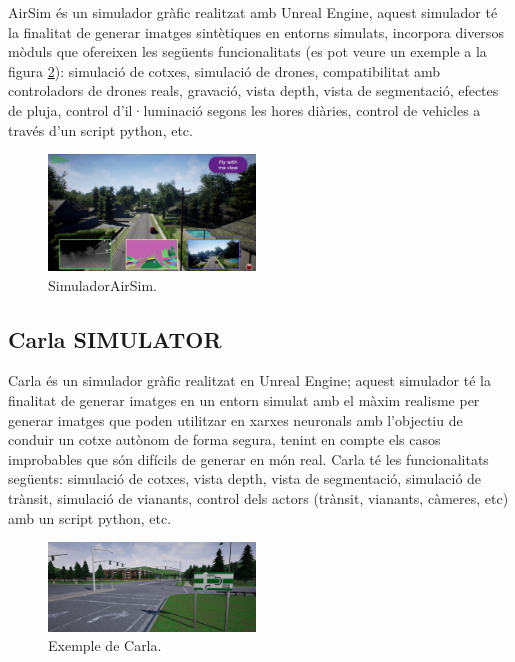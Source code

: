 \documentclass[10pt,a4paper,twocolumn,twoside]{article}
\begin{document}
AirSim és un simulador gràfic realitzat amb Unreal Engine, aquest simulador té la finalitat de generar imatges sintètiques en entorns simulats, incorpora diversos mòduls que ofereixen les següents funcionalitats (es pot veure un exemple a la figura \ref{fig-airsim}): simulació de cotxes, simulació de drones, compatibilitat amb controladors de drones reals, gravació, vista depth, vista de segmentació, efectes de pluja, control d’il·luminació segons les hores diàries, control de vehicles a través d’un script python, etc.

\begin{figure}[!h]
\centering
  	\includegraphics[width=0.49\textwidth]{airsim}
	\caption{SimuladorAirSim.}
	\label{fig-airsim}
\end{figure}

\subsection{Carla SIMULATOR}

Carla és un simulador gràfic realitzat en Unreal Engine; aquest simulador té la finalitat de generar imatges en un entorn simulat amb el màxim realisme per generar imatges que poden utilitzar en xarxes neuronals amb l'objectiu de conduir un cotxe autònom de forma segura, tenint en compte els casos improbables que són difícils de generar en món real. Carla té les funcionalitats següents: simulació de cotxes, vista depth, vista de segmentació, simulació de trànsit, simulació de vianants, control dels actors (trànsit, vianants, càmeres, etc) amb un script python, etc.

\begin{figure}[!h]
\centering
  	\includegraphics[width=0.49\textwidth]{carlatown}
	\caption{Exemple de Carla.}
	\label{fig-airsim}
\end{figure}
\end{document}
